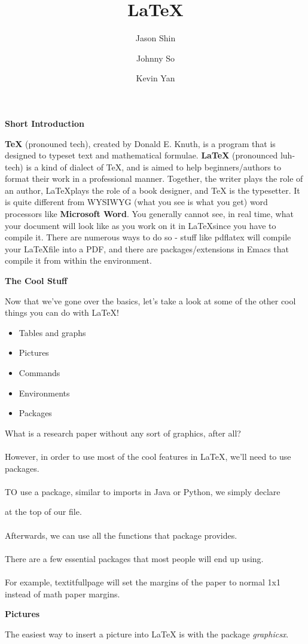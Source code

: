 \documentclass[a4paper,12pt]{article}
\title{LaTeX}
\author{Jason Shin \and Johnny So \and Kevin Yan}
\begin{document}
\maketitle

\newpage
\begin{center}
  \bf{\Huge{Short Introduction}}
\end{center}
\bigskip
\Large
\textbf{\TeX} (pronouned tech), created by Donald E. Knuth, is a program that is
designed to typeset text and mathematical formulae. \textbf{\LaTeX} (pronounced
luh-tech) is a kind of dialect of TeX, and is aimed to help beginners/authors to
format their work in a professional manner. Together, the writer plays the role
of an author, \LaTeX plays the role of a book designer, and TeX is the
typesetter. It is quite different from WYSIWYG (what you see is what you get)
word processors like \textbf{Microsoft Word}. You generally cannot see, in real
time, what your document will look like as you work on it in \LaTeX since you
have to compile it. There are numerous ways to do so - stuff like pdflatex will
compile your \LaTeX file into a PDF, and there are packages/extensions in Emacs
that compile it from within the environment.


\newpage
\begin{center}
	\bf{\Huge{The Cool Stuff}}
\end{center}
\bigskip
\Large
Now that we've gone over the basics, let's take a look at some of the other cool things you can do with LaTeX!
\begin{itemize}
	\item Tables and graphs
	\item Pictures
	\item Commands
	\item Environments
	\item Packages
\end{itemize}
\medskip
\large
What is a research paper without any sort of graphics, after all? \\\\
However, in order to use most of the cool features in LaTeX, we'll need to use packages. \\\\
TO use a package, similar to imports in Java or Python, we simply declare \usepackage{packagename} at the top of our file. \\\\
Afterwards, we can use all the functions that package provides. \\\\
There are a few essential packages that most people will end up using. \\\\
For example, textit{fullpage} will set the margins of the paper to normal 1x1 instead of math paper margins.

\newpage
\begin{center}
  \bf{\Huge{Pictures}}
\end{center}
\bigskip
\Large
The easiest way to insert a picture into LaTeX is with the package \textit{graphicsx}. \\\\
\large
\end{document}
